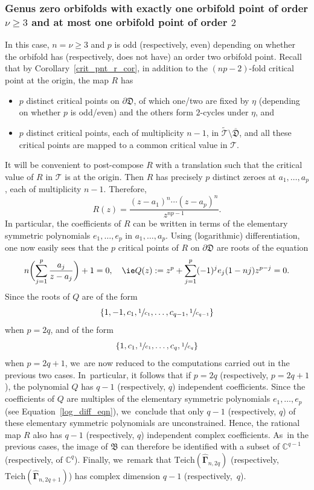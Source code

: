 \documentclass[JEP,XML,SOM,Unicode,NoFloatCountersInSection,published]{cedram}
\theoremstyle{definition}
\theoremstyle{remark}
\newcommand{\C}{\mathbb{C}}
\newcommand{\cT}{\mathcal{T}}
\begin{document}
\subsubsection*{Genus zero orbifolds with exactly one orbifold point of order $\nu\geq 3$ and at most one orbifold point of order $2$}
In this case, $n=\nu\geq 3$ and $p$ is odd (respectively, even) depending on whether the orbifold has (respectively, does not have) an order two orbifold point. Recall that by Corollary~\ref{crit_pnt_r_cor}, in addition to the $(np-2)$-fold critical point at the origin, the map $R$ has
\begin{itemize}
\item $p$ distinct critical points on $\partial\mathfrak{D}$, of which one/two are fixed by $\eta$ (depending on whether $p$ is odd/even) and the others form $2$-cycles under $\eta$, and
\item $p$ distinct critical points, each of multiplicity $n-1$, in $\widetilde{\cT}\setminus\overline{\mathfrak{D}}$, and all these critical points are mapped to a common critical value in $\cT$.
\end{itemize}
It will be convenient to post-compose $R$ with a translation such that the critical value of $R$ in $\cT$ is at the origin. Then $R$ has precisely $p$ distinct zeroes at $a_1,\dots, a_p$, each of multiplicity $n-1$. Therefore,
\[
R(z)=\frac{(z-a_1)^n\cdots (z-a_p)^n}{z^{np-1}}.
\]
In particular, the coefficients of $R$ can be written in terms of the elementary symmetric polynomials $e_1,\dots, e_p$ in $a_1,\dots, a_p$. Using (logarithmic) differentiation, one now easily sees that the $p$ critical points of $R$ on $\partial\mathfrak{D}$ are roots of the equation
\begin{equation}
n\biggl(\sum_{j=1}^p \frac{a_j}{z-a_j} \biggr) +1 =0,\quad\text{\ie}
Q(z):= z^p+\sum_{j=1}^p (-1)^j e_j (1-nj) z^{p-j}=0.
\label{log_diff_eqn}
\end{equation}
Since the roots of $Q$ are of the form
\[
\{1, -1, c_1,\sfrac{1}{c_1},\dots, c_{q-1},\sfrac{1}{c_{q-1}}\}
\]
when $p=2q$, and of the form
\[
\{1, c_1,\sfrac{1}{c_1},\dots, c_{q},\sfrac{1}{c_{q}}\}
\]
when $p=2q+1$, we~are now reduced to the computations carried out in the previous two cases. In~particular, it follows that if $p=2q$ (respectively, $p=2q+1$), the polynomial $Q$ has $q-1$ (respectively, $q$) independent coefficients. Since the coefficients of $Q$ are multiples of the elementary symmetric polynomials $e_1,\dots, e_p$ (see Equation~\eqref{log_diff_eqn}), we~conclude that only $q-1$ (respectively, $q$) of these elementary symmetric polynomials are unconstrained. Hence, the rational map $R$ also has $q-1$ (respectively, $q$) independent complex coefficients. As~in the previous cases, the image of $\mathfrak{B}$ can therefore be identified with a subset of $\C^{q-1}$ (respectively, of $\C^q$).
Finally, we~remark that $\mathrm{Teich}(\widehat{\pmb{\Gamma}}_{n,2q})$ (respectively, $\mathrm{Teich}(\widehat{\pmb{\Gamma}}_{n,2q+1})$) has complex dimension $q-1$ (respectively,~$q$).
\end{document}
